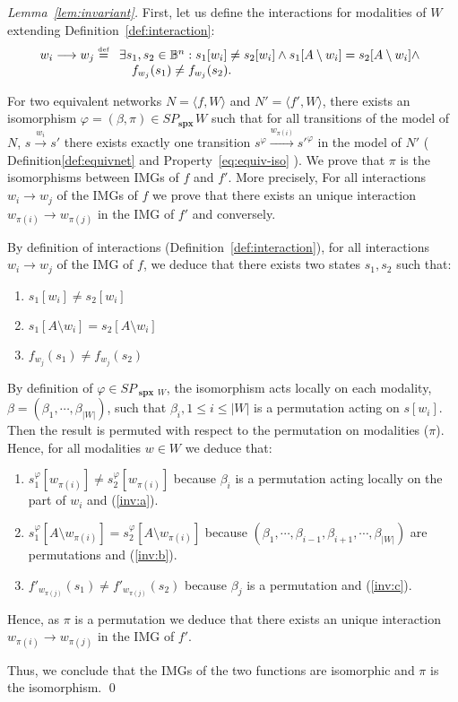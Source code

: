 \documentclass[12pt]{elsarticle}
\newcommand{\tuple}[1]{\langle #1 \rangle}
\newcommand{\Bset}[0]{\mathbb{B}}
\newcommand{\eqdef}[0]{\stackrel{\scriptscriptstyle{\mathrm{def}}}{=}}
\newcommand{\spectrum}[0]{{\operatorname{\textbf{spx}}\,}}
\begin{document}
\begin{proof}[Lemma~\ref{lem:invariant}]
First, let us  define the interactions for modalities of $W$  extending Definition~\ref{def:interaction}:
$$ w_i \longrightarrow w_j \eqdef 
	\begin{array}[t]{l}
	\exists s_1,s_2 \in \Bset^n: s_1[w_i] \neq s_2[w_i] \wedge s_1[A \setminus w_i] = s_2 [A \setminus w_i] \wedge \\
 \quad f_{w_j}(s_1) \neq f_{w_j}(s_2).
	\end{array}
$$

For two equivalent networks $N=\tuple{f,W}$ and $N'=\tuple{f',W}$,  there exists an isomorphism $\varphi=(\beta,\pi) \in SP_\spectrum{W}$ such that for all transitions of the model of $N$, $s \stackrel{w_i}{\longrightarrow} s'$ there exists exactly one transition $s^\varphi \stackrel{w_{\pi(i)}}{\longrightarrow} s'^\varphi$ in the model of $N'$ ( Definition\ref{def:equivnet} and Property~\ref{eq:equiv-iso} ). We prove that $\pi$ is the isomorphisms between IMGs of $f$ and $f'$. More precisely,  For all interactions $w_i \longrightarrow w_j$ of the IMGs of $f$ we prove that there exists an unique interaction $w_{\pi(i)} \longrightarrow w_{\pi(j)}$ in the IMG of $f'$ and conversely.  

\medskip 
By definition of interactions (Definition~\ref{def:interaction}), for all interactions $w_i \longrightarrow w_j$ of the IMG of $f$, we deduce that there exists two states $s_1,s_2$ such that:
\begin{enumerate}
\item $s_1[w_i] \neq s_2[w_i]$ \label{inv:a}
\item $s_1[A\setminus w_i] = s_2[A\setminus w_i]$ \label{inv:b}
\item $f_{w_j}(s_1) \neq f_{w_j}(s_2)$ \label{inv:c}
\end{enumerate}

By definition of $\varphi \in SP_{\spectrum{W}}$, the isomorphism acts locally on each modality, $\beta=(\beta_1,\cdots,\beta_{|W|})$, such that $\beta_i, 1 \leq i \leq |W|$ is a permutation acting on $s[w_i]$. Then the result is permuted with respect to the permutation on modalities ($\pi$). Hence, for all modalities $w \in W$ 
we deduce that: 
 \begin{enumerate}
\item $s_1^\varphi [w_{\pi(i)}] \neq s_2^\varphi[w_{\pi(i)}]$ because $\beta_i$ is a permutation  acting locally on  the part of $w_i$ and (\ref{inv:a}).
\item $s_1^\varphi[A\setminus w_{\pi(i)}] = s_2^\varphi[A\setminus w_{\pi(i)}]$ because $(\beta_1,\cdots, \beta_{i-1},\beta_{i+1}, \cdots, \beta_{|W|})$ are permutations and (\ref{inv:b}). 
 \item $f'_{w_{\pi(j)}}(s_1) \neq f'_{w_{\pi(j)}}(s_2)$ because $\beta_j$ is a permutation and (\ref{inv:c}).
\end{enumerate}
Hence, as $\pi$ is a permutation  we deduce that there exists an unique interaction $w_{\pi(i)} \longrightarrow w_{\pi(j)}$ in the IMG of $f'$. 

\medskip
\noindent
 Thus, we conclude that the IMGs of the two functions are isomorphic and $\pi$ is the isomorphism.
\qed \end{proof}
\end{document}
